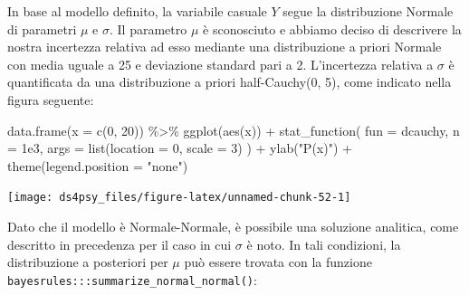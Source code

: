 \documentclass[
  11pt,
]{krantz}
\makeatletter
\newenvironment{Shaded}{\begin{snugshade}}{\end{snugshade}}
\newcommand{\AttributeTok}[1]{\textcolor[rgb]{0.61,0.61,0.61}{#1}}
\newcommand{\CommentTok}[1]{\textcolor[rgb]{0.37,0.37,0.37}{\textit{#1}}}
\newcommand{\DecValTok}[1]{\textcolor[rgb]{0.06,0.06,0.06}{#1}}
\newcommand{\FloatTok}[1]{\textcolor[rgb]{0.06,0.06,0.06}{#1}}
\newcommand{\FunctionTok}[1]{\textcolor[rgb]{0,0,0}{#1}}
\newcommand{\NormalTok}[1]{#1}
\newcommand{\SpecialCharTok}[1]{\textcolor[rgb]{0,0,0}{#1}}
\newcommand{\StringTok}[1]{\textcolor[rgb]{0.5,0.5,0.5}{#1}}
\newenvironment{kframe}{%
\medskip{}
\setlength{\fboxsep}{.8em}
 \def\at@end@of@kframe{}%
 \ifinner\ifhmode%
  \def\at@end@of@kframe{\end{minipage}}%
  \begin{minipage}{\columnwidth}%
 \fi\fi%
 \def\FrameCommand##1{\hskip\@totalleftmargin \hskip-\fboxsep
 \colorbox{shadecolor}{##1}\hskip-\fboxsep
     \hskip-\linewidth \hskip-\@totalleftmargin \hskip\columnwidth}%
 \MakeFramed {\advance\hsize-\width
   \@totalleftmargin\z@ \linewidth\hsize
   \@setminipage}}%
 {\par\unskip\endMakeFramed%
 \at@end@of@kframe}
\renewenvironment{Shaded}{\begin{kframe}}{\end{kframe}}
\theoremstyle{definition}
\theoremstyle{definition}
\theoremstyle{definition}
\theoremstyle{definition}
\theoremstyle{remark}
\makeatother
\begin{document}
In base al modello definito, la variabile casuale \(Y\) segue la distribuzione Normale di parametri \(\mu\) e \(\sigma\). Il parametro \(\mu\) è sconosciuto e abbiamo deciso di descrivere la nostra incertezza relativa ad esso mediante una distribuzione a priori Normale con media uguale a 25 e deviazione standard pari a 2. L'incertezza relativa a \(\sigma\) è quantificata da una distribuzione a priori half-Cauchy(0, 5), come indicato nella figura seguente:

\begin{Shaded}
\begin{Highlighting}[]
\FunctionTok{data.frame}\NormalTok{(}\AttributeTok{x =} \FunctionTok{c}\NormalTok{(}\DecValTok{0}\NormalTok{, }\DecValTok{20}\NormalTok{)) }\SpecialCharTok{\%\textgreater{}\%}
  \FunctionTok{ggplot}\NormalTok{(}\FunctionTok{aes}\NormalTok{(x)) }\SpecialCharTok{+}
  \FunctionTok{stat\_function}\NormalTok{(}
    \AttributeTok{fun =}\NormalTok{ dcauchy,}
    \AttributeTok{n =} \FloatTok{1e3}\NormalTok{,}
    \AttributeTok{args =} \FunctionTok{list}\NormalTok{(}\AttributeTok{location =} \DecValTok{0}\NormalTok{, }\AttributeTok{scale =} \DecValTok{3}\NormalTok{)}
\NormalTok{  ) }\SpecialCharTok{+}
  \FunctionTok{ylab}\NormalTok{(}\StringTok{"P(x)"}\NormalTok{) }\SpecialCharTok{+}
  \FunctionTok{theme}\NormalTok{(}\AttributeTok{legend.position =} \StringTok{"none"}\NormalTok{)}
\end{Highlighting}
\end{Shaded}

\begin{center}\texttt{[image: ds4psy\_files/figure-latex/unnamed-chunk-52-1]} \end{center}

Dato che il modello è Normale-Normale, è possibile una soluzione analitica, come descritto in precedenza per il caso in cui \(\sigma\) è noto. In tali condizioni, la distribuzione a posteriori per \(\mu\) può essere trovata con la funzione \texttt{bayesrules:::summarize\_normal\_normal()}:

\begin{Shaded}
\end{Shaded}
\end{document}
